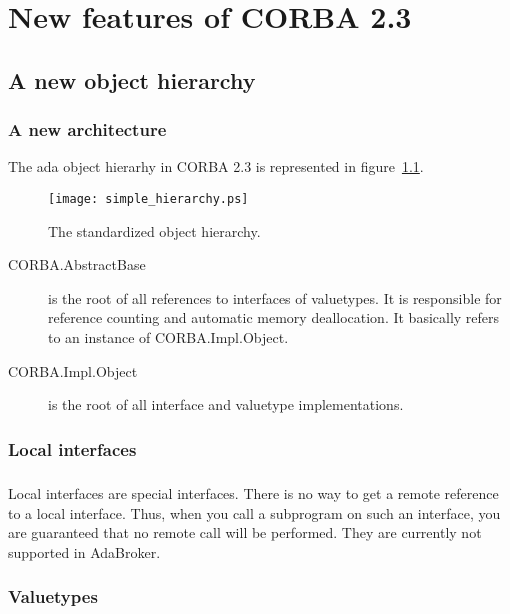 \chapter{New features of CORBA 2.3}

\section{A new object hierarchy}


\subsection{A new architecture}
The ada object hierarhy in CORBA 2.3 is represented in
figure~\ref{fig::simple_hierarchy}.


\vspace{2mm}
\begin{figure}[!htbp]
    \texttt{[image: simple\_hierarchy.ps]}
  \caption{The standardized object hierarchy.}
  \label{fig::simple_hierarchy}
\end{figure}

\begin{description}
\item[CORBA.AbstractBase] is the root of all references to interfaces of
valuetypes. It is responsible for reference counting and automatic
memory deallocation. It basically refers to an instance of CORBA.Impl.Object.

\item[CORBA.Impl.Object] is the root of all interface and valuetype implementations.
\end{description}

\subsection{Local interfaces}
\paragraph{}Local interfaces are special interfaces. There is no way
to get a remote reference to a local interface. Thus, when you call a
subprogram on such an interface, you are guaranteed that no remote
call will be performed. They are currently not supported in AdaBroker.

\subsection{Valuetypes}
